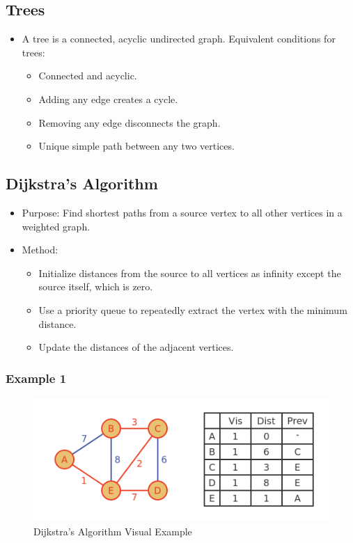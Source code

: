 \documentclass[8pt]{article}
\begin{document}
\subsection{Trees}
\begin{itemize}
    \item A tree is a connected, acyclic undirected graph. Equivalent conditions for trees:
    \begin{itemize}
        \item Connected and acyclic.
        \item Adding any edge creates a cycle.
        \item Removing any edge disconnects the graph.
        \item Unique simple path between any two vertices.
    \end{itemize}
\end{itemize}
\newpage
\subsection{Dijkstra's Algorithm}
\begin{itemize}
    \item Purpose: Find shortest paths from a source vertex to all other vertices in a weighted graph.
    \item Method:
    \begin{itemize}
        \item Initialize distances from the source to all vertices as infinity except the source itself, which is zero.
        \item Use a priority queue to repeatedly extract the vertex with the minimum distance.
        \item Update the distances of the adjacent vertices.
    \end{itemize}
\end{itemize}

\subsubsection*{Example 1}
\begin{figure}[h]
    \centering
    \includegraphics[width=0.5\linewidth]{images/algorithm-5.png}
    \caption{Dijkstra's Algorithm Visual Example}
    \label{fig:enter-label}
\end{figure}
\end{document}
